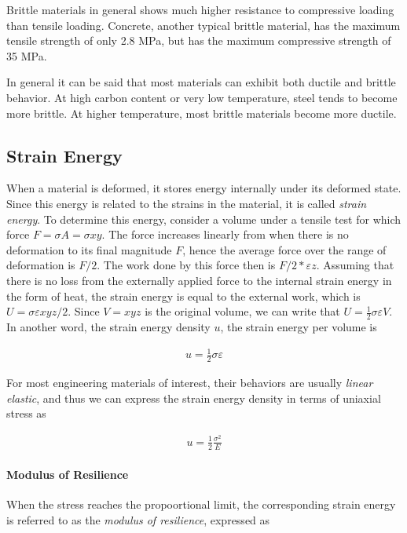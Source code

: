 \documentclass[
10pt,
a4paper,
openany,
svgnames,
]{book} %
\begin{document}
Brittle materials in general shows much higher resistance to compressive loading than tensile loading. Concrete, another typical brittle material, has the maximum tensile strength of only 2.8 MPa, but has the maximum compressive strength of 35 MPa.

In general it can be said that most materials can exhibit both ductile and brittle behavior. At high carbon content or very low temperature, steel tends to become more brittle. At higher temperature, most brittle materials become more ductile.

\subsection{Strain Energy}

When a material is deformed, it stores energy internally under its deformed state. Since this energy is related to the strains in the material, it is called \emph{strain energy}. To determine this energy, consider a volume under a tensile test for which force $F = \sigma A = \sigma xy$. The force increases linearly from when there is no deformation to its final magnitude $F$, hence the average force over the range of deformation is $F/2$. The work done by this force then is $F/2*\varepsilon z$. Assuming that there is no loss from the externally applied force to the internal strain energy in the form of heat, the strain energy is equal to the external work, which is $U = \sigma\varepsilon xyz/2$. Since $V = xyz$ is the original volume, we can write that $U = \frac{1}{2}\sigma\varepsilon V$. In another word, the strain energy density $u$, the strain energy per volume is

\begin{align}
  \label{eq: strain energy density}
  u = \frac{1}{2}\sigma\varepsilon
\end{align}

For most engineering materials of interest, their behaviors are usually \emph{linear elastic}, and thus we can express the strain energy density in terms of uniaxial stress as

\begin{align}
  \label{eq: strain energy density - linear elastic}
  u = \frac{1}{2}\frac{\sigma^2}{E}
\end{align}

\paragraph{Modulus of Resilience} When the stress reaches the propoortional limit, the corresponding strain energy is referred to as the \emph{modulus of resilience}, expressed as
\end{document}
